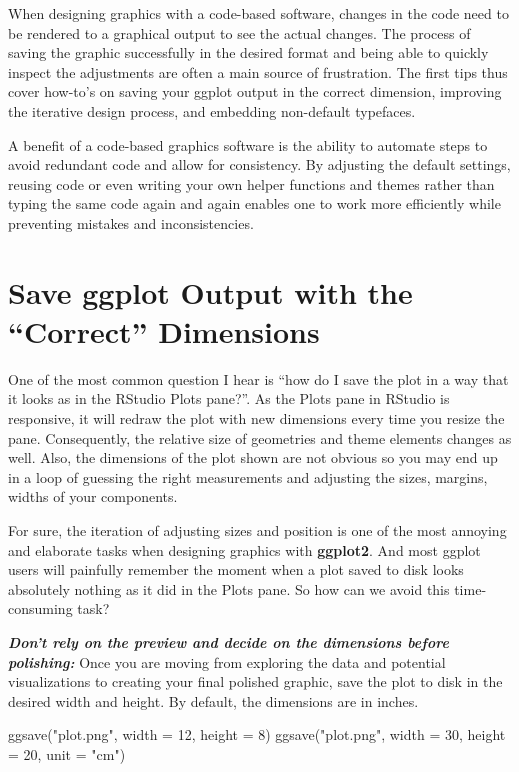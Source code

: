 \documentclass[
]{krantz}
\makeatletter
\newenvironment{Shaded}{\begin{snugshade}}{\end{snugshade}}
\newcommand{\AttributeTok}[1]{\textcolor[rgb]{0.61,0.61,0.61}{#1}}
\newcommand{\DecValTok}[1]{\textcolor[rgb]{0.06,0.06,0.06}{#1}}
\newcommand{\FunctionTok}[1]{\textcolor[rgb]{0,0,0}{#1}}
\newcommand{\NormalTok}[1]{#1}
\newcommand{\StringTok}[1]{\textcolor[rgb]{0.5,0.5,0.5}{#1}}
\newenvironment{kframe}{%
\medskip{}
\setlength{\fboxsep}{.8em}
 \def\at@end@of@kframe{}%
 \ifinner\ifhmode%
  \def\at@end@of@kframe{\end{minipage}}%
  \begin{minipage}{\columnwidth}%
 \fi\fi%
 \def\FrameCommand##1{\hskip\@totalleftmargin \hskip-\fboxsep
 \colorbox{shadecolor}{##1}\hskip-\fboxsep
     \hskip-\linewidth \hskip-\@totalleftmargin \hskip\columnwidth}%
 \MakeFramed {\advance\hsize-\width
   \@totalleftmargin\z@ \linewidth\hsize
   \@setminipage}}%
 {\par\unskip\endMakeFramed%
 \at@end@of@kframe}
\renewenvironment{Shaded}{\begin{kframe}}{\end{kframe}}
\makeatother
\begin{document}
When designing graphics with a code-based software, changes in the code need to be rendered to a graphical output to see the actual changes. The process of saving the graphic successfully in the desired format and being able to quickly inspect the adjustments are often a main source of frustration. The first tips thus cover how-to's on saving your ggplot output in the correct dimension, improving the iterative design process, and embedding non-default typefaces.

A benefit of a code-based graphics software is the ability to automate steps to avoid redundant code and allow for consistency. By adjusting the default settings, reusing code or even writing your own helper functions and themes rather than typing the same code again and again enables one to work more efficiently while preventing mistakes and inconsistencies.

\hypertarget{save-ggplot-output-with-the-correct-dimensions}{%
\section{Save ggplot Output with the ``Correct'' Dimensions}\label{save-ggplot-output-with-the-correct-dimensions}}

One of the most common question I hear is ``how do I save the plot in a way that it looks as in the RStudio Plots pane?''. As the Plots pane in RStudio is responsive, it will redraw the plot with new dimensions every time you resize the pane. Consequently, the relative size of geometries and theme elements changes as well. Also, the dimensions of the plot shown are not obvious so you may end up in a loop of guessing the right measurements and adjusting the sizes, margins, widths of your components.

For sure, the iteration of adjusting sizes and position is one of the most annoying and elaborate tasks when designing graphics with \textbf{ggplot2}. And most ggplot users will painfully remember the moment when a plot saved to disk looks absolutely nothing as it did in the Plots pane. So how can we avoid this time-consuming task?

\textbf{\emph{Don't rely on the preview and decide on the dimensions before polishing:}} Once you are moving from exploring the data and potential visualizations to creating your final polished graphic, save the plot to disk in the desired width and height. By default, the dimensions are in inches.

\begin{Shaded}
\begin{Highlighting}[]
\FunctionTok{ggsave}\NormalTok{(}\StringTok{"plot.png"}\NormalTok{, }\AttributeTok{width =} \DecValTok{12}\NormalTok{, }\AttributeTok{height =} \DecValTok{8}\NormalTok{)}
\FunctionTok{ggsave}\NormalTok{(}\StringTok{"plot.png"}\NormalTok{, }\AttributeTok{width =} \DecValTok{30}\NormalTok{, }\AttributeTok{height =} \DecValTok{20}\NormalTok{, }\AttributeTok{unit =} \StringTok{"cm"}\NormalTok{)}
\end{Highlighting}
\end{Shaded}
\end{document}
